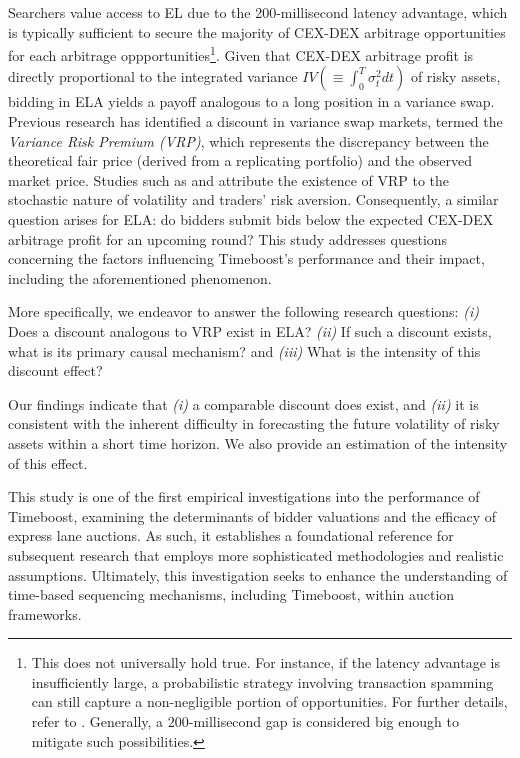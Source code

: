 Searchers value access to EL due to the 200-millisecond latency advantage, which is typically sufficient to secure the majority of CEX-DEX arbitrage opportunities for each arbitrage oppportunities\footnote{This does not universally hold true. For instance, if the latency advantage is insufficiently large, a probabilistic strategy involving transaction spamming can still capture a non-negligible portion of opportunities. For further details, refer to \cite{akaki2025blind}. Generally, a $200$-millisecond gap is considered big enough to mitigate such possibilities.}. Given that CEX-DEX arbitrage profit is directly proportional to the integrated variance $IV (\equiv \int^T_0 \sigma^2_t dt)$ of risky assets, bidding in ELA yields a payoff analogous to a long position in a variance swap. Previous research has identified a discount in variance swap markets, termed the \emph{Variance Risk Premium (VRP)}, which represents the discrepancy between the theoretical fair price (derived from a replicating portfolio) and the observed market price. Studies such as \cite{bollerslev2009expected} and \cite{carr2009variance} attribute the existence of VRP to the stochastic nature of volatility and traders' risk aversion. Consequently, a similar question arises for ELA: do bidders submit bids below the expected CEX-DEX arbitrage profit for an upcoming round? This study addresses questions concerning the factors influencing Timeboost's performance and their impact, including the aforementioned phenomenon.

More specifically, we endeavor to answer the following research questions: \emph{(i)} Does a discount analogous to VRP exist in ELA? \emph{(ii)} If such a discount exists, what is its primary causal mechanism? and \emph{(iii)} What is the intensity of this discount effect?

Our findings indicate that \emph{(i)} a comparable discount does exist, and \emph{(ii)} it is consistent with the inherent difficulty in forecasting the future volatility of risky assets within a short time horizon. We also provide an estimation of the intensity of this effect.

This study is one of the first empirical investigations into the performance of Timeboost, examining the determinants of bidder valuations and the efficacy of express lane auctions. As such, it establishes a foundational reference for subsequent research that employs more sophisticated methodologies and realistic assumptions. Ultimately, this investigation seeks to enhance the understanding of time-based sequencing mechanisms, including Timeboost, within auction frameworks.

